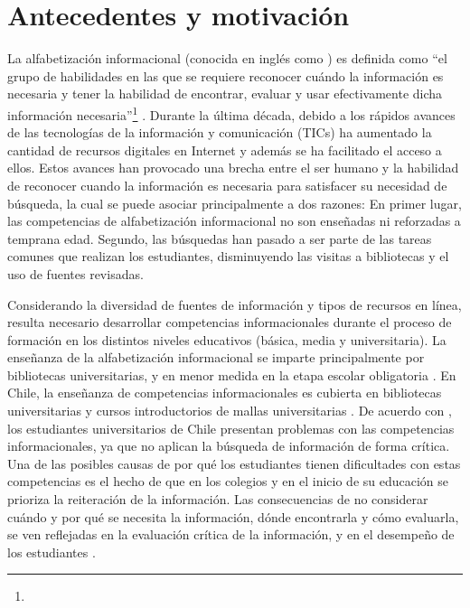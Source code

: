 \section{Antecedentes y motivación}
\label{sec:antecedentes-motivacion}
La alfabetización informacional (conocida en inglés como ) es definida como “el grupo de habilidades en las que se requiere reconocer cuándo la información es necesaria y tener la habilidad de encontrar, evaluar y usar efectivamente dicha información necesaria”\footnote{\traduccionlibre} \parencite[p.~2]{american2000information}. Durante la última década, debido a los rápidos avances de las tecnologías de la información y comunicación (TICs) ha aumentado la cantidad de recursos digitales en Internet y además se ha facilitado el acceso a ellos. Estos avances han provocado una brecha entre el ser humano y la habilidad de reconocer cuando la información es necesaria para satisfacer su necesidad de búsqueda, la cual se puede asociar principalmente a dos razones: En primer lugar, las competencias de alfabetización informacional no son enseñadas ni reforzadas a temprana edad. Segundo, las búsquedas  han pasado a ser parte de las tareas comunes que realizan los estudiantes, disminuyendo las visitas a bibliotecas y el uso de fuentes revisadas.

Considerando la diversidad de fuentes de información y tipos de recursos en línea, resulta necesario desarrollar competencias informacionales durante el proceso de formación en los distintos niveles educativos (básica, media y universitaria). La enseñanza de la alfabetización informacional se imparte principalmente por bibliotecas universitarias, y en menor medida en la etapa escolar obligatoria \parencite{weiner2014teaches}. En Chile, la enseñanza de competencias informacionales es cubierta en bibliotecas universitarias y cursos introductorios de mallas universitarias \parencite{marzal2015diagnostico}. De acuerdo con \textcite{urra2016alfabetizacion}, los estudiantes universitarios de Chile presentan problemas con las competencias informacionales, ya que no aplican la búsqueda de información de forma crítica. Una de las posibles causas de por qué los estudiantes tienen dificultades con estas competencias es el hecho de que en los colegios y en el inicio de su educación se prioriza la reiteración de la información. Las consecuencias de no considerar cuándo y por qué se necesita la información, dónde encontrarla y cómo evaluarla, se ven reflejadas en la evaluación crítica de la información, y en el desempeño de los estudiantes \parencite{urra2016alfabetizacion}. 

